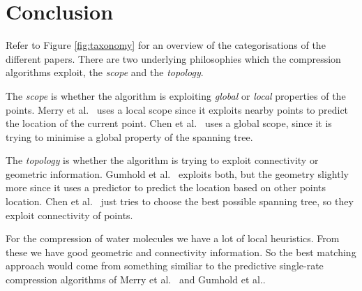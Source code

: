 \documentclass{report}
\begin{document}
\section{Conclusion}

Refer to Figure \ref{fig:taxonomy} for an overview of the categorisations of
the different papers. There are two underlying philosophies which the
compression algorithms exploit, the \emph{scope} and the \emph{topology}.

The \emph{scope} is whether the algorithm is exploiting \emph{global} or
\emph{local} properties of the points. Merry et al.~\cite{merrycomp} uses a
local scope since it exploits nearby points to predict the location of the
current point. Chen et al.~\cite{chen2005lcp} uses a global scope, since it is
trying to minimise a global property of the spanning tree.

The \emph{topology} is whether the algorithm is trying to exploit connectivity
or geometric information. Gumhold et al.~\cite{gumholdcomp} exploits both, but
the geometry slightly more since it uses a predictor to predict the location
based on other points location. Chen et al.~\cite{chen2005lcp} just tries to
choose the best possible spanning tree, so they exploit connectivity of
points.

For the compression of water molecules we have a lot of local heuristics. From
these we have good geometric and connectivity information. So the best
matching approach would come from something similiar to the predictive
single-rate compression algorithms of Merry et al.~\cite{merrycomp} and
Gumhold et al.\cite{gumholdcomp}.
\end{document}
